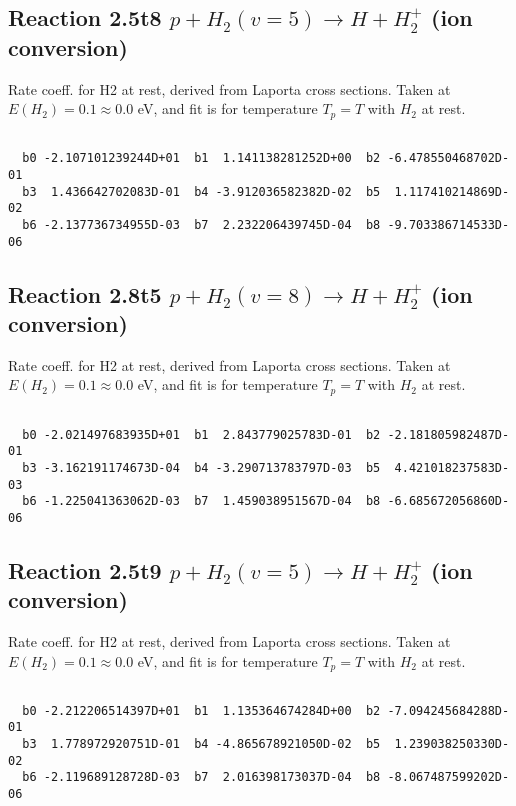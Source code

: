 \documentclass[12pt,dvipdfmx]{article}
\begin{document}
\newpage
\subsection{
Reaction 2.5t8
$ p + H_2(v=5) \rightarrow H + H_2^+$ (ion conversion)
}
Rate coeff. for H2 at rest, derived from Laporta cross sections.
Taken at $E(H_2) = 0.1 \approx 0.0$ eV,  and fit is for temperature $T_p=T$ with $H_2$ at rest.

\begin{small}\begin{verbatim}

  b0 -2.107101239244D+01  b1  1.141138281252D+00  b2 -6.478550468702D-01
  b3  1.436642702083D-01  b4 -3.912036582382D-02  b5  1.117410214869D-02
  b6 -2.137736734955D-03  b7  2.232206439745D-04  b8 -9.703386714533D-06

\end{verbatim}\end{small}

\newpage
\subsection{
Reaction 2.8t5
$ p + H_2(v=8) \rightarrow H + H_2^+$ (ion conversion)
}
Rate coeff. for H2 at rest, derived from Laporta cross sections.
Taken at $E(H_2) = 0.1 \approx 0.0$ eV,  and fit is for temperature $T_p=T$ with $H_2$ at rest.

\begin{small}\begin{verbatim}

  b0 -2.021497683935D+01  b1  2.843779025783D-01  b2 -2.181805982487D-01
  b3 -3.162191174673D-04  b4 -3.290713783797D-03  b5  4.421018237583D-03
  b6 -1.225041363062D-03  b7  1.459038951567D-04  b8 -6.685672056860D-06

\end{verbatim}\end{small}

\newpage
\subsection{
Reaction 2.5t9
$ p + H_2(v=5) \rightarrow H + H_2^+$ (ion conversion)
}
Rate coeff. for H2 at rest, derived from Laporta cross sections.
Taken at $E(H_2) = 0.1 \approx 0.0$ eV,  and fit is for temperature $T_p=T$ with $H_2$ at rest.

\begin{small}\begin{verbatim}

  b0 -2.212206514397D+01  b1  1.135364674284D+00  b2 -7.094245684288D-01
  b3  1.778972920751D-01  b4 -4.865678921050D-02  b5  1.239038250330D-02
  b6 -2.119689128728D-03  b7  2.016398173037D-04  b8 -8.067487599202D-06

\end{verbatim}\end{small}
\end{document}

